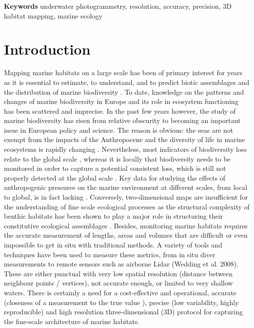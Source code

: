 \medskip
\noindent\textbf{Keywords}
underwater photogrammetry, resolution, accuracy, precision, 3D habitat mapping, marine ecology

\section[Introduction]{Introduction}\label{chapitre2_1}
Mapping marine habitats on a large scale has been of primary interest for years as it is essential to estimate, to understand, and to predict biotic assemblages and the distribution of marine biodiversity \citep{tittensor_mid-term_2014}. To date, knowledge on the patterns and changes of marine biodiversity in Europe and its role in ecosystem functioning has been scattered and imprecise. In the past few years however, the study of marine biodiversity has risen from relative obscurity to becoming an important issue in European policy and science. The reason is obvious: the seas are not exempt from the impacts of the Anthropocene and the diversity of life in marine ecosystems is rapidly changing \citep{mcgill_fifteen_2015}. Nevertheless, most indicators of biodiversity loss relate to the global scale \citep{pimm_biodiversity_2014}, whereas it is locally that biodiversity needs to be monitored in order to capture a potential consistent loss, which is still not properly detected at the global scale \citep{dornelas_assemblage_2014}. Key data for studying the effects of anthropogenic pressures on the marine environment at different scales, from local to global, is in fact lacking \citep{halpern_global_2008}. Conversely, two-dimensional maps are insufficient for the understanding of fine scale ecological processes as the structural complexity of benthic habitats has been shown to play a major role in structuring their constitutive ecological assemblages \citep{agudo-adriani_colony_2016, darling_relationships_2017, friedlander_designing_2003, graham_importance_2013, kovalenko_habitat_2012}. Besides, monitoring marine habitats requires the accurate measurement of lengths, areas and volumes that are difficult or even impossible to get in situ with traditional methods. A variety of tools and techniques have been used to measure these metrics, from in situ diver measurements \citep{dustan_digital_2013} to remote sensors such as airborne Lidar (Wedding et al. 2008). These are either punctual with very low spatial resolution (distance between neighbour points / vertices), not accurate enough, or limited to very shallow waters. There is certainly a need for a cost-effective and operational, accurate (closeness of a measurement to the true value \citep{granshaw_photogrammetric_2016}), precise (low variability, highly reproducible) and high resolution three-dimensional (3D) protocol for capturing the fine-scale architecture of marine habitats.
